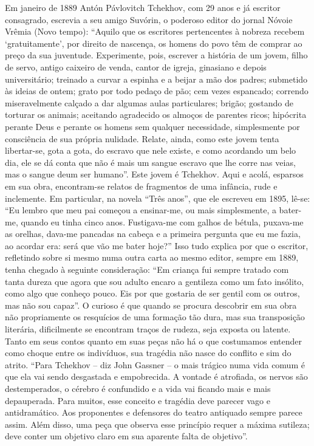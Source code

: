 Em janeiro de 1889 Antón Pávlovitch Tchekhov, com 29 anos e já escritor
consagrado, escrevia a seu amigo Suvórin, o poderoso editor do jornal
Nóvoie Vrêmia (Novo tempo): ``Aquilo que os escritores pertencentes à
nobreza recebem `gratuitamente', por direito de nascença, os homens do
povo têm de comprar ao preço da sua juventude. Experimente, pois,
escrever a história de um jovem, filho de servo, antigo caixeiro de
venda, cantor de igreja, ginasiano e depois universitário; treinado a
curvar a espinha e a beijar a mão dos padres; submetido às ideias de
ontem; grato por todo pedaço de pão; cem vezes espancado; correndo
miseravelmente calçado a dar algumas aulas particulares; brigão;
gostando de torturar os animais; aceitando agradecido os almoços de
parentes ricos; hipócrita perante Deus e perante os homens sem qualquer
necessidade, simplesmente por consciência de sua própria nulidade.
Relate, ainda, como este jovem tenta libertar-se, gota a gota, do
escravo que nele existe, e como acordando um belo dia, ele se dá conta
que não é mais um sangue escravo que lhe corre nas veias, mas o sangue
deum ser humano''. Este jovem é Tchekhov. Aqui e acolá, esparsos em sua
obra, encontram-se relatos de fragmentos de uma infância, rude e
inclemente. Em particular, na novela ``Três anos'', que ele escreveu em
1895, lê-se: ``Eu lembro que meu pai começou a ensinar-me, ou mais
simplesmente, a bater-me, quando eu tinha cinco anos. Fustigava-me com
galhos de bétula, puxava-me as orelhas, dava-me pancadas na cabeça e a
primeira pergunta que eu me fazia, ao acordar era: será que vão me bater
hoje?'' Isso tudo explica por que o escritor, refletindo sobre si mesmo
numa outra carta ao mesmo editor, sempre em 1889, tenha chegado à
seguinte consideração: ``Em criança fui sempre tratado com tanta dureza
que agora que sou adulto encaro a gentileza como um fato insólito, como
algo que conheço pouco. Eis por que gostaria de ser gentil com os
outros, mas não sou capaz''. O curioso é que quando se procura descobrir
em sua obra não propriamente os resquícios de uma formação tão dura, mas
sua transposição literária, dificilmente se encontram traços de rudeza,
seja exposta ou latente. Tanto em seus contos quanto em suas peças não
há o que costumamos entender como choque entre os indivíduos, sua
tragédia não nasce do conflito e sim do atrito. ``Para Tchekhov -- diz
John Gassner -- o mais trágico numa vida comum é que ela vai sendo
desgastada e empobrecida. A vontade é atrofiada, os nervos são
destemperados, o cérebro é confundido e a vida vai ficando mais e mais
depauperada. Para muitos, esse conceito e tragédia deve parecer vago e
antidramático. Aos proponentes e defensores do teatro antiquado sempre
parece assim. Além disso, uma peça que observa esse princípio requer a
máxima sutileza; deve conter um objetivo claro em sua aparente falta de
objetivo''.

